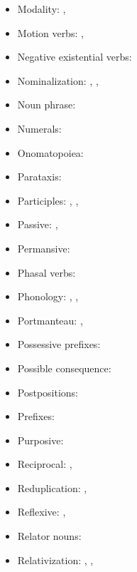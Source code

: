 \documentclass[oldfontcommands,oneside,a4paper,11pt]{article}
\begin{document}
\begin{itemize}
\item Modality: \citet[261-265]{jacques16complementation}, \citet[615-621]{jacques17sketch}
\item Motion verbs: \citet[201-6]{jacques13harmonization}, \citet[267]{jacques16complementation}
\item Negative existential verbs: \citet[270-273]{jacques16complementation}
\item Nominalization: \citet[5-7]{jacques14antipassive}, \citet{jacques16relatives}, \citet{jacques16complementation}
\item Noun phrase: \citet[627]{jacques17sketch}
\item Numerals: \citet[4]{jacques14antipassive}
\item Onomatopoiea:   \citet[282]{japhug14ideophones}
\item Parataxis:  \citet[312;315]{jacques14linking}
\item Participles: \citet[5-6]{jacques14antipassive}, \citet{jacques16relatives}, \citet{jacques16complementation}
\item Passive: \citet{jacques07passif}, \citet[208-13]{jacques12demotion}
\item Permansive: \citet{jacques15spontaneous}
\item Phasal verbs: \citet[265]{jacques16complementation}
\item Phonology: \citet[12-82]{jacques04these}, \citet{jacques08}, \citet{jacques17ipa}
\item Portmanteau: \citet[136-7]{jacques10inverse}, \citet{jacques17generic}
\item Possessive prefixes: \citet[4]{jacques14antipassive}
\item Possible consequence:  \citet[308-311]{jacques14linking}
\item Postpositions:  \citet[272-4]{jacques14linking}
\item Prefixes: \citet[196-199]{jacques13harmonization}
\item Purposive:  \citet[306-8]{jacques14linking}
\item Reciprocal: \citet{jacques07passif}, \citet[212]{jacques12demotion}
\item Reduplication: \citet{jacques04these}, \citet{jacques07redupl}
\item Reflexive: \citet{jacques10refl}, \citet[85]{jacques12agreement}
\item Relator nouns:  \citet[274-6]{jacques14linking}
\item Relativization: \citet{jacques08}, \citet{jacques16relatives},\citet{jacques17sketch}

\end{itemize}
\end{document}
